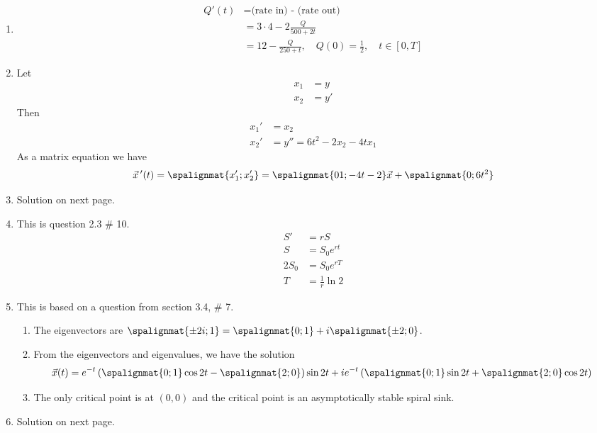 \documentclass[12pt]{exam}
\begin{document}
\begin{enumerate}
    \item \begin{align*}
        Q'(t) &= \text{(rate in) - (rate out)} \\ 
        &= 3\cdot4 - 2\frac{Q}{500+2t} \\
        &= 12 - \frac{Q}{250+t}, \quad Q(0) = \frac12, \quad t \in [0,T]
    \end{align*}
    \item Let 
    \begin{align*}
        x_1 &= y \\
        x_2 &= y' 
    \end{align*}
    Then 
    \begin{align*}
        x_1' &= x_2 \\
        x_2' &= y'' = 6t^2 - 2x_2 - 4tx_1
    \end{align*}
    As a matrix equation we have
    \begin{align*}
        \vec x \, ' (t) = \spalignmat{x_1';x_2'} = \spalignmat{0 1;-4t -2}\vec x + \spalignmat{0;6t^2}
    \end{align*}
    
    \item Solution on next page. 
    
    \newpage
    
    \item This is question 2.3 \# 10. 
    \begin{align*}
        S' &= r S \\ 
        S &= S_0e^{rt} \\
        2S_0 &= S_0e^{rT} \\
        T &= \frac 1r \ln 2
    \end{align*}
    \item This is based on a question from section 3.4, \# 7. 
    \begin{enumerate}
        \item The eigenvectors are $\spalignmat{\pm2i;1}=\spalignmat{0;1}+ i\spalignmat{\pm2;0}$.
        \item From the eigenvectors and eigenvalues, we have the solution $$\vec x (t) = e^{-t} \left( \spalignmat{0;1}\cos2t - \spalignmat{2;0 } \right)\sin2t + i e^{-t}\left( \spalignmat{0;1}\sin2t + \spalignmat{2;0 }\cos2t \right)$$
        \item The only critical point is at $(0,0)$ and the critical point is an asymptotically stable spiral sink.
    \end{enumerate}
    \item Solution on next page. 
\end{enumerate}
\end{document}
